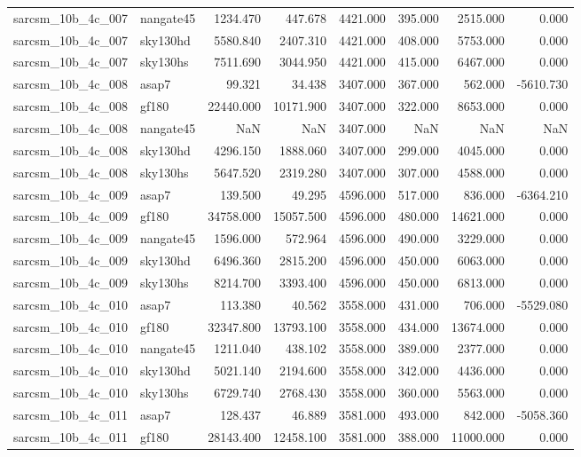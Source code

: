 \begin{tabular}{llrrrrrr}
sarcsm\_10b\_4c\_007 & nangate45 & 1234.470 & 447.678 & 4421.000 & 395.000 & 2515.000 & 0.000 \\
sarcsm\_10b\_4c\_007 & sky130hd & 5580.840 & 2407.310 & 4421.000 & 408.000 & 5753.000 & 0.000 \\
sarcsm\_10b\_4c\_007 & sky130hs & 7511.690 & 3044.950 & 4421.000 & 415.000 & 6467.000 & 0.000 \\
sarcsm\_10b\_4c\_008 & asap7 & 99.321 & 34.438 & 3407.000 & 367.000 & 562.000 & -5610.730 \\
sarcsm\_10b\_4c\_008 & gf180 & 22440.000 & 10171.900 & 3407.000 & 322.000 & 8653.000 & 0.000 \\
sarcsm\_10b\_4c\_008 & nangate45 & NaN & NaN & 3407.000 & NaN & NaN & NaN \\
sarcsm\_10b\_4c\_008 & sky130hd & 4296.150 & 1888.060 & 3407.000 & 299.000 & 4045.000 & 0.000 \\
sarcsm\_10b\_4c\_008 & sky130hs & 5647.520 & 2319.280 & 3407.000 & 307.000 & 4588.000 & 0.000 \\
sarcsm\_10b\_4c\_009 & asap7 & 139.500 & 49.295 & 4596.000 & 517.000 & 836.000 & -6364.210 \\
sarcsm\_10b\_4c\_009 & gf180 & 34758.000 & 15057.500 & 4596.000 & 480.000 & 14621.000 & 0.000 \\
sarcsm\_10b\_4c\_009 & nangate45 & 1596.000 & 572.964 & 4596.000 & 490.000 & 3229.000 & 0.000 \\
sarcsm\_10b\_4c\_009 & sky130hd & 6496.360 & 2815.200 & 4596.000 & 450.000 & 6063.000 & 0.000 \\
sarcsm\_10b\_4c\_009 & sky130hs & 8214.700 & 3393.400 & 4596.000 & 450.000 & 6813.000 & 0.000 \\
sarcsm\_10b\_4c\_010 & asap7 & 113.380 & 40.562 & 3558.000 & 431.000 & 706.000 & -5529.080 \\
sarcsm\_10b\_4c\_010 & gf180 & 32347.800 & 13793.100 & 3558.000 & 434.000 & 13674.000 & 0.000 \\
sarcsm\_10b\_4c\_010 & nangate45 & 1211.040 & 438.102 & 3558.000 & 389.000 & 2377.000 & 0.000 \\
sarcsm\_10b\_4c\_010 & sky130hd & 5021.140 & 2194.600 & 3558.000 & 342.000 & 4436.000 & 0.000 \\
sarcsm\_10b\_4c\_010 & sky130hs & 6729.740 & 2768.430 & 3558.000 & 360.000 & 5563.000 & 0.000 \\
sarcsm\_10b\_4c\_011 & asap7 & 128.437 & 46.889 & 3581.000 & 493.000 & 842.000 & -5058.360 \\
sarcsm\_10b\_4c\_011 & gf180 & 28143.400 & 12458.100 & 3581.000 & 388.000 & 11000.000 & 0.000 \\

\end{tabular}
